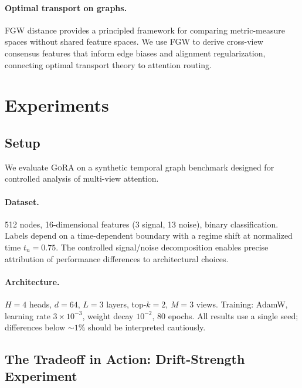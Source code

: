 \documentclass[11pt,a4paper]{article}
\newcommand{\ours}{\textsc{GoRA}}  %
\begin{document}
\paragraph{Optimal transport on graphs.}
FGW distance \citep{vayer2019optimal, peyre2019computational} provides
a principled framework for comparing metric-measure spaces without
shared feature spaces.
We use FGW to derive cross-view consensus features that inform edge
biases and alignment regularization, connecting optimal transport theory
to attention routing.


\section{Experiments}
\label{sec:experiments}

\subsection{Setup}
\label{sec:setup}

We evaluate \ours{} on a synthetic temporal graph benchmark designed for
controlled analysis of multi-view attention.

\paragraph{Dataset.}
512 nodes, 16-dimensional features (3 signal, 13 noise), binary
classification.
Labels depend on a time-dependent boundary with a regime shift at
normalized time $t_n = 0.75$.
The controlled signal/noise decomposition enables precise attribution
of performance differences to architectural choices.

\paragraph{Architecture.}
$H = 4$ heads, $d = 64$, $L = 3$ layers, top-$k = 2$, $M = 3$ views.
Training: AdamW, learning rate $3 \times 10^{-3}$, weight decay
$10^{-2}$, 80 epochs.
All results use a single seed; differences below $\sim\!1\%$ should
be interpreted cautiously.

\subsection{The Tradeoff in Action: Drift-Strength Experiment}
\label{sec:drift}
\end{document}
